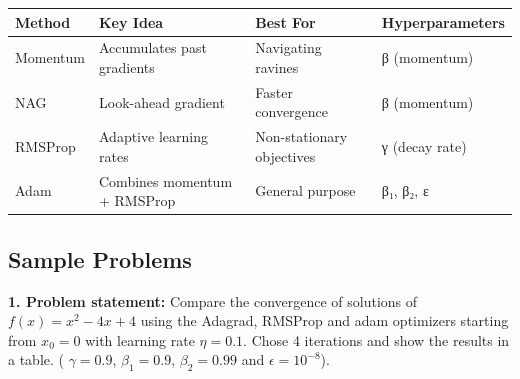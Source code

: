 \documentclass[
  letterpaper,
  DIV=11,
  numbers=noendperiod]{scrreprt}
\begin{document}
\begin{longtable}[]{@{}
  >{\raggedright\arraybackslash}p{}
  >{\raggedright\arraybackslash}p{}
  >{\raggedright\arraybackslash}p{}
  >{\raggedright\arraybackslash}p{}@{}}
\toprule\noalign{}
\begin{minipage}[b]{\linewidth}\raggedright
Method
\end{minipage} & \begin{minipage}[b]{\linewidth}\raggedright
Key Idea
\end{minipage} & \begin{minipage}[b]{\linewidth}\raggedright
Best For
\end{minipage} & \begin{minipage}[b]{\linewidth}\raggedright
Hyperparameters
\end{minipage} \\
\midrule\noalign{}
\endhead
\bottomrule\noalign{}
\endlastfoot
Momentum & Accumulates past gradients & Navigating ravines & β
(momentum) \\
NAG & Look-ahead gradient & Faster convergence & β (momentum) \\
RMSProp & Adaptive learning rates & Non-stationary objectives & γ (decay
rate) \\
Adam & Combines momentum + RMSProp & General purpose & β₁, β₂, ε \\
\end{longtable}

\subsection{Sample Problems}\label{sample-problems}

\textbf{1. Problem statement:} Compare the convergence of solutions of
\(f(x)=x^2-4x+4\) using the Adagrad, RMSProp and adam optimizers
starting from \(x_0=0\) with learning rate \(\eta=0.1\). Chose 4
iterations and show the results in a table. ( \(\gamma=0.9\),
\(\beta_1=0.9\), \(\beta_2=0.99\) and \(\epsilon=10^{-8}\)).
\end{document}
